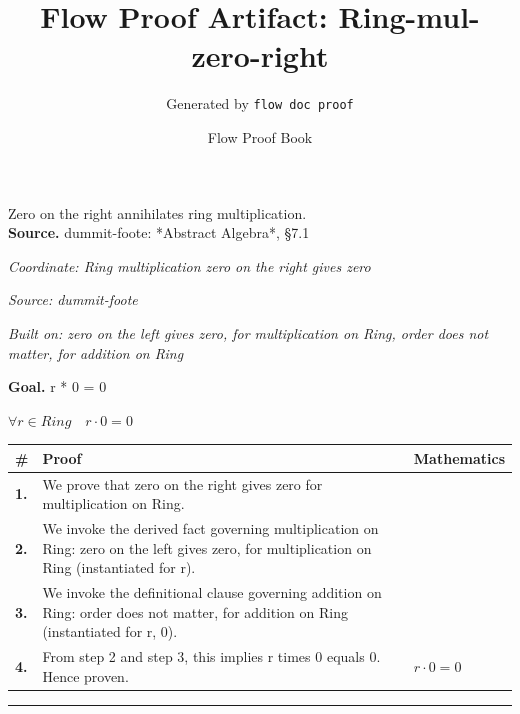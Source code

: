 \documentclass[11pt]{article}
\title{Flow Proof Artifact: Ring-mul-zero-right}
\author{Generated by \texttt{flow doc proof}}
\date{Flow Proof Book}
\theoremstyle{definition}
\begin{document}
\maketitle
Zero on the right annihilates ring multiplication.\\[0.5em]
\textbf{Source.} dummit-foote: *Abstract Algebra*, §7.1\\[0.5em]
\bigskip
{}\par
\smallskip\noindent\textit{Coordinate: Ring \cdot multiplication \cdot zero on the right gives zero}\par
\smallskip\noindent\textit{Source: dummit-foote}\par
\smallskip\noindent\textit{Built on: zero on the left gives zero, for multiplication on Ring, order does not matter, for addition on Ring}\par
\medskip
\noindent\textbf{Goal.} r * 0 = 0\par
\noindent$\displaystyle \forall r \in Ring\quad r \cdot 0 = 0$\par
\medskip
\noindent
\begin{tabular}{@{} >{\raggedright\arraybackslash}p{} >{\raggedright\arraybackslash}p{} >{\raggedleft\arraybackslash}p{} @{}}
\textbf{\#} & \textbf{Proof} & \textbf{Mathematics} \\
\midrule
\textbf{1.} & We prove that zero on the right gives zero for multiplication on Ring. & \\[0.45em]
\textbf{2.} & We invoke the derived fact governing multiplication on Ring: zero on the left gives zero, for multiplication on Ring (instantiated for r). & \\[0.45em]
\textbf{3.} & We invoke the definitional clause governing addition on Ring: order does not matter, for addition on Ring (instantiated for r, 0). & \\[0.45em]
\textbf{4.} & From step 2 and step 3, this implies r times 0 equals 0. Hence proven. & $\displaystyle r \cdot 0 = 0$ \\[0.45em]
\bottomrule
\end{tabular}
\label{thm:Ring-multiplication-zero_on_the_right_gives_zero}
\par\medskip\hrule
\end{document}
